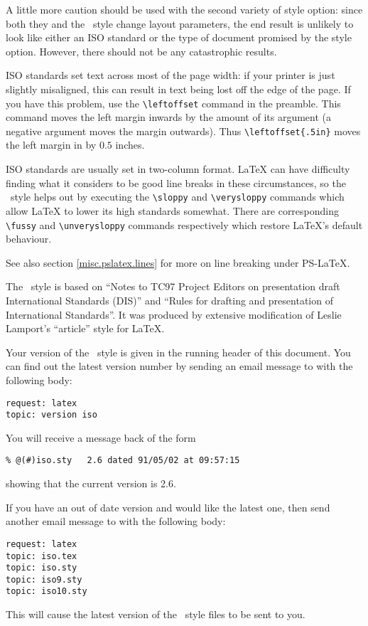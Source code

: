 A little more caution should be used with the second variety of style
option: since both they and the \iso\ style change layout parameters,
the end result is unlikely to look like either an ISO standard or the
type of document promised by the style option.
However, there should not be any catastrophic results.

ISO standards set text across most of the page width: if your printer is
just slightly misaligned, this can result in text being lost off the edge
of the page.
If you have this problem, use the \verb|\leftoffset| command in the preamble.
This command moves the left margin inwards by the amount of its
argument (a negative argument moves the margin outwards).
Thus \verb|\leftoffset{.5in}| moves the left margin in by $0.5$ inches.

ISO standards are usually set in two-column format.
LaTeX can have difficulty finding what it considers to be good line breaks
in these circumstances, so the \iso\ style helps out by executing the
\verb|\sloppy| and
\verb|\verysloppy| commands which allow LaTeX to lower its high standards
somewhat.
There are corresponding \verb|\fussy| and \verb|\unverysloppy| commands
respectively which restore LaTeX's default behaviour.

See also section \ref{misc.pslatex.lines} for more on line breaking under
PS-LaTeX.

The \iso\ style is based on ``Notes to TC97 Project Editors on presentation
draft International Standards (DIS)'' and ``Rules for drafting and presentation
of International Standards''.
It was produced by extensive modification of Leslie Lamport's ``article''
style for LaTeX.

Your version of the \iso\ style is given in the running header of this
document.
You can find out the latest version number by sending an email message to
 with the following body:
\begin{verbatim}
request: latex
topic: version iso
\end{verbatim}
You will receive a message back of the form
\begin{verbatim}
% @(#)iso.sty   2.6 dated 91/05/02 at 09:57:15
\end{verbatim}
showing that the current version is 2.6.

If you have an out of date version and would like the latest one, then send
another email message to  with the following
body:
\begin{verbatim}
request: latex
topic: iso.tex
topic: iso.sty
topic: iso9.sty
topic: iso10.sty
\end{verbatim}
This will cause the latest version of the \iso\ style files to be sent to you.

